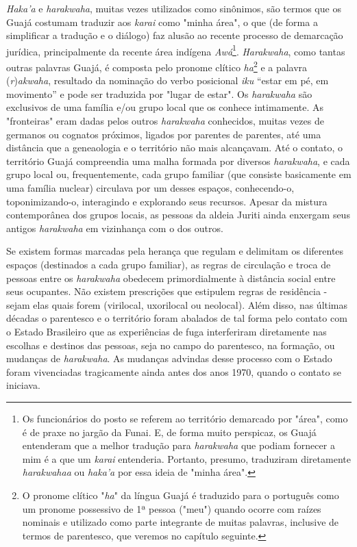 \emph{Haka'a} e \emph{harakwaha}, muitas vezes utilizados como
sinônimos, são termos que os Guajá costumam traduzir aos \emph{karai}
como "minha área", o que (de forma a simplificar a tradução e o diálogo)
faz alusão ao recente processo de demarcação jurídica, principalmente da
recente área indígena \emph{Awá}\footnote{Os funcionários do posto se
  referem ao território demarcado por "área", como é de praxe no jargão
  da Funai. E, de forma muito perspicaz, os Guajá entenderam que a
  melhor tradução para \emph{harakwaha} que podiam fornecer a mim é a
  que um \emph{karai} entenderia. Portanto, presumo, traduziram
  diretamente \emph{harakwahaa} ou \emph{haka'a} por essa ideia de
  "minha área".}. \emph{Harakwaha}, como tantas outras palavras Guajá, é
composta pelo pronome clítico \emph{ha}\footnote{O pronome clítico
  "\emph{ha}" da língua Guajá é traduzido para o português como um
  pronome possessivo de 1ª pessoa ("meu") quando ocorre com raízes
  nominais e utilizado como parte integrante de muitas palavras,
  inclusive de termos de parentesco, que veremos no capítulo seguinte.}
e a palavra (\emph{r})\emph{akwaha}, resultado da nominação do verbo
posicional \emph{iku} ``estar em pé, em movimento'' e pode ser traduzida
por "lugar de estar". Os \emph{harakwaha} são exclusivos de uma família
e/ou grupo local que os conhece intimamente. As "fronteiras" eram dadas
pelos outros \emph{harakwaha} conhecidos, muitas vezes de germanos ou
cognatos próximos, ligados por parentes de parentes, até uma distância
que a geneaologia e o território não mais alcançavam. Até o contato, o
território Guajá compreendia uma malha formada por diversos
\emph{harakwaha}, e cada grupo local ou, frequentemente, cada grupo
familiar (que consiste basicamente em uma família nuclear) circulava por
um desses espaços, conhecendo-o, toponimizando-o, interagindo e
explorando seus recursos. Apesar da mistura contemporânea dos grupos
locais, as pessoas da aldeia Juriti ainda enxergam seus antigos
\emph{harakwaha} em vizinhança com o dos outros.

Se existem formas marcadas pela herança que regulam e delimitam os
diferentes espaços (destinados a cada grupo familiar), as regras de
circulação e troca de pessoas entre os \emph{harakwaha} obedecem
primordialmente à distância social entre seus ocupantes. Não existem
prescrições que estipulem regras de residência - sejam elas quais forem
(virilocal, uxorilocal ou neolocal). Além disso, nas últimas décadas o
parentesco e o território foram abalados de tal forma pelo contato com o
Estado Brasileiro que as experiências de fuga interferiram diretamente
nas escolhas e destinos das pessoas, seja no campo do parentesco, na
formação, ou mudanças de \emph{harakwaha}. As mudanças advindas desse
processo com o Estado foram vivenciadas tragicamente ainda antes dos
anos 1970, quando o contato se iniciava.

